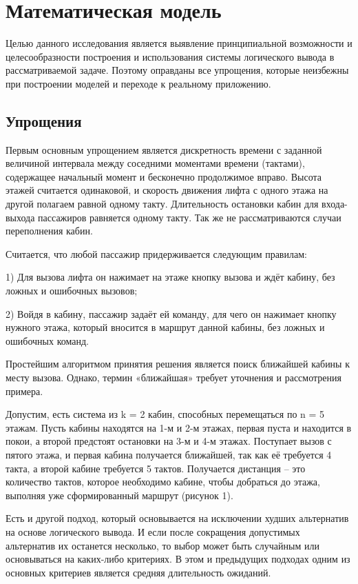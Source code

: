 \section{  Математическая модель}

	Целью данного исследования является выявление принципиальной возможности и целесообразности построения
		и использования системы логического вывода в рассматриваемой задаче.
		Поэтому оправданы все упрощения, которые неизбежны при построении моделей и переходе к реальному приложению.

\subsection{Упрощения}
	Первым основным упрощением является дискретность времени с заданной величиной интервала между
		соседними моментами времени (тактами), содержащее начальный момент и бесконечно продолжимое вправо.
		Высота этажей считается одинаковой, и скорость движения лифта с одного этажа на другой полагаем
		равной одному такту. Длительность остановки кабин для входа-выхода пассажиров равняется одному такту.
		Так же не рассматриваются случаи переполнения кабин.

	Считается, что любой пассажир придерживается следующим правилам:

	1) Для вызова лифта он нажимает на этаже кнопку вызова и ждёт кабину, без ложных и ошибочных вызовов;

	2) Войдя в кабину, пассажир задаёт ей команду, для чего он нажимает кнопку нужного этажа,
		который вносится в маршрут данной кабины, без ложных и ошибочных команд.

	Простейшим алгоритмом принятия решения является поиск ближайшей кабины к месту вызова.
		Однако, термин «ближайшая» требует уточнения и рассмотрения примера. 

	Допустим, есть система из k = 2 кабин, способных перемещаться по n = 5 этажам.
		Пусть кабины находятся на 1-м и 2-м этажах, первая пуста и находится в покои,
		а второй предстоят остановки на 3-м и 4-м этажах. Поступает вызов с пятого этажа,
		и первая кабина получается ближайшей, так как её требуется 4 такта,
		а второй кабине требуется 5 тактов. Получается дистанция – это количество тактов,
		которое необходимо кабине, чтобы добраться до этажа, выполняя уже сформированный маршрут (рисунок 1).

	Есть и другой подход, который основывается на исключении худших альтернатив на основе логического вывода.
		И если после сокращения допустимых альтернатив их останется несколько,
		то выбор может быть случайным или основываться на каких-либо критериях.
		В этом и предыдущих подходах одним из основных критериев является средняя длительность ожиданий.

